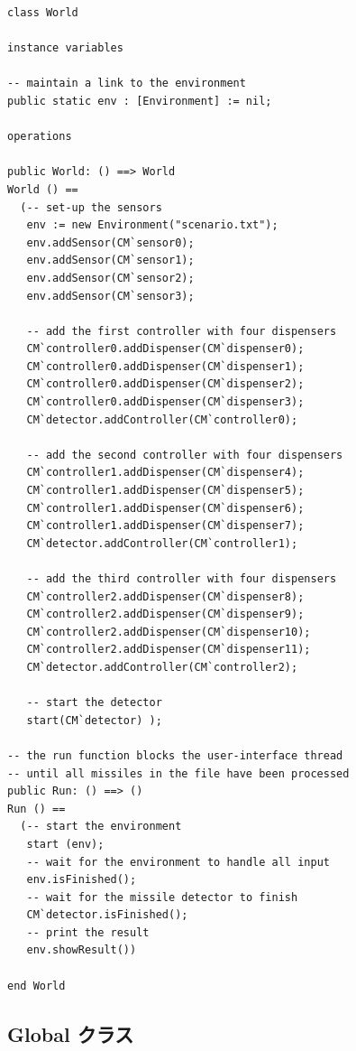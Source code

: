 \documentclass[\pformat,12pt]{jreport}
\begin{document}
\begin{lstlisting}
class World

instance variables

-- maintain a link to the environment
public static env : [Environment] := nil;

operations

public World: () ==> World
World () ==
  (-- set-up the sensors
   env := new Environment("scenario.txt");
   env.addSensor(CM`sensor0);
   env.addSensor(CM`sensor1);
   env.addSensor(CM`sensor2);
   env.addSensor(CM`sensor3);

   -- add the first controller with four dispensers
   CM`controller0.addDispenser(CM`dispenser0);
   CM`controller0.addDispenser(CM`dispenser1);
   CM`controller0.addDispenser(CM`dispenser2);
   CM`controller0.addDispenser(CM`dispenser3);
   CM`detector.addController(CM`controller0);

   -- add the second controller with four dispensers
   CM`controller1.addDispenser(CM`dispenser4);
   CM`controller1.addDispenser(CM`dispenser5);
   CM`controller1.addDispenser(CM`dispenser6);
   CM`controller1.addDispenser(CM`dispenser7);
   CM`detector.addController(CM`controller1);
 
   -- add the third controller with four dispensers
   CM`controller2.addDispenser(CM`dispenser8);
   CM`controller2.addDispenser(CM`dispenser9);
   CM`controller2.addDispenser(CM`dispenser10);
   CM`controller2.addDispenser(CM`dispenser11);
   CM`detector.addController(CM`controller2);
      
   -- start the detector
   start(CM`detector) );

-- the run function blocks the user-interface thread
-- until all missiles in the file have been processed
public Run: () ==> ()
Run () == 
  (-- start the environment
   start (env);
   -- wait for the environment to handle all input
   env.isFinished();
   -- wait for the missile detector to finish
   CM`detector.isFinished();
   -- print the result
   env.showResult())

end World
\end{lstlisting}

\subsection{Global クラス}
\end{document}
